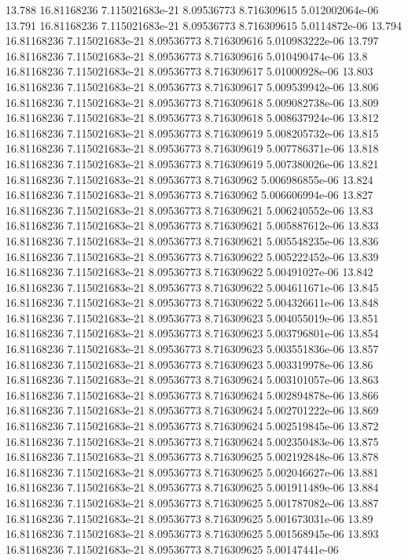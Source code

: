 {13.788 16.81168236 7.115021683e-21 8.09536773 8.716309615 5.012002064e-06
13.791 16.81168236 7.115021683e-21 8.09536773 8.716309615 5.0114872e-06
13.794 16.81168236 7.115021683e-21 8.09536773 8.716309616 5.010983222e-06
13.797 16.81168236 7.115021683e-21 8.09536773 8.716309616 5.010490474e-06
13.8 16.81168236 7.115021683e-21 8.09536773 8.716309617 5.01000928e-06
13.803 16.81168236 7.115021683e-21 8.09536773 8.716309617 5.009539942e-06
13.806 16.81168236 7.115021683e-21 8.09536773 8.716309618 5.009082738e-06
13.809 16.81168236 7.115021683e-21 8.09536773 8.716309618 5.008637924e-06
13.812 16.81168236 7.115021683e-21 8.09536773 8.716309619 5.008205732e-06
13.815 16.81168236 7.115021683e-21 8.09536773 8.716309619 5.007786371e-06
13.818 16.81168236 7.115021683e-21 8.09536773 8.716309619 5.007380026e-06
13.821 16.81168236 7.115021683e-21 8.09536773 8.71630962 5.006986855e-06
13.824 16.81168236 7.115021683e-21 8.09536773 8.71630962 5.006606994e-06
13.827 16.81168236 7.115021683e-21 8.09536773 8.716309621 5.006240552e-06
13.83 16.81168236 7.115021683e-21 8.09536773 8.716309621 5.005887612e-06
13.833 16.81168236 7.115021683e-21 8.09536773 8.716309621 5.005548235e-06
13.836 16.81168236 7.115021683e-21 8.09536773 8.716309622 5.005222452e-06
13.839 16.81168236 7.115021683e-21 8.09536773 8.716309622 5.00491027e-06
13.842 16.81168236 7.115021683e-21 8.09536773 8.716309622 5.004611671e-06
13.845 16.81168236 7.115021683e-21 8.09536773 8.716309622 5.004326611e-06
13.848 16.81168236 7.115021683e-21 8.09536773 8.716309623 5.004055019e-06
13.851 16.81168236 7.115021683e-21 8.09536773 8.716309623 5.003796801e-06
13.854 16.81168236 7.115021683e-21 8.09536773 8.716309623 5.003551836e-06
13.857 16.81168236 7.115021683e-21 8.09536773 8.716309623 5.003319978e-06
13.86 16.81168236 7.115021683e-21 8.09536773 8.716309624 5.003101057e-06
13.863 16.81168236 7.115021683e-21 8.09536773 8.716309624 5.002894878e-06
13.866 16.81168236 7.115021683e-21 8.09536773 8.716309624 5.002701222e-06
13.869 16.81168236 7.115021683e-21 8.09536773 8.716309624 5.002519845e-06
13.872 16.81168236 7.115021683e-21 8.09536773 8.716309624 5.002350483e-06
13.875 16.81168236 7.115021683e-21 8.09536773 8.716309625 5.002192848e-06
13.878 16.81168236 7.115021683e-21 8.09536773 8.716309625 5.002046627e-06
13.881 16.81168236 7.115021683e-21 8.09536773 8.716309625 5.001911489e-06
13.884 16.81168236 7.115021683e-21 8.09536773 8.716309625 5.001787082e-06
13.887 16.81168236 7.115021683e-21 8.09536773 8.716309625 5.001673031e-06
13.89 16.81168236 7.115021683e-21 8.09536773 8.716309625 5.001568945e-06
13.893 16.81168236 7.115021683e-21 8.09536773 8.716309625 5.00147441e-06
}
